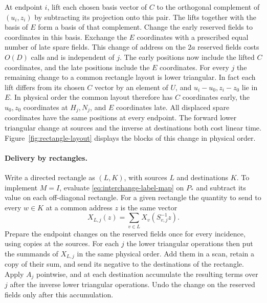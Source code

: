 At endpoint $i$, lift each chosen basis vector of $C$ to the
orthogonal complement of $(u_i,z_i)$ by subtracting its projection
onto this pair. The lifts together with the basis of $E$ form a basis
of that complement. Change the early reserved fields to coordinates
in this basis. Exchange the $E$ coordinates with a prescribed equal
number of late spare fields. This change of address on the $2a$
reserved fields costs $O(D)$ calls and is independent of $j$. The
early positions now include the lifted $C$ coordinates, and the late
positions include the $E$ coordinates. For every $j$ the remaining
change to a common rectangle layout is lower triangular. In fact each
lift differs from its chosen $C$ vector by an element of $U$, and
$u_i-u_0,z_i-z_0$ lie in $E$. In physical order the common layout
therefore has $C$ coordinates early, the $u_0,z_0$ coordinates at
$H_j,N_j$, and $E$ coordinates late. All displaced spare coordinates
have the same positions at every endpoint. The forward lower
triangular change at sources and the inverse at destinations both
cost linear time. Figure~\ref{fig:rectangle-layout} displays the blocks
of this change in physical order.




\paragraph{Delivery by rectangles.}
Write a directed rectangle as $(L,K)$, with sources $L$ and
destinations $K$. To implement $M=I$, evaluate
\eqref{eq:interchange-label-map} on $P_*$ and subtract its value on
each off-diagonal rectangle. For a given rectangle the quantity to
send to every $w\in K$ at a common address $z$ is the same vector
\[
             X_{L,j}(z)=\sum_{v\in L} X_v(S_{v,j}^{-1}z).
\]
Prepare the endpoint changes on the reserved fields once for every
incidence, using copies at the sources. For each $j$ the lower
triangular operations then put the summands of $X_{L,j}$ in the same
physical order. Add them in a scan, retain a copy of their sum, and
send its negative to the destinations of the rectangle. Apply $A_j$
pointwise, and at each destination accumulate the resulting terms
over $j$ after the inverse lower triangular operations. Undo the
change on the reserved fields only after this accumulation.


